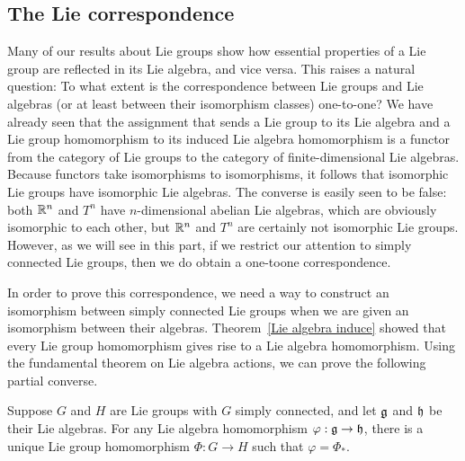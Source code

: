 \subsection{The Lie correspondence}
Many of our results about Lie groups show how essential properties of a Lie group are reflected in its Lie algebra, and vice versa. This raises a natural question: To what extent is the correspondence between Lie groups and Lie algebras (or at least between their isomorphism classes) one-to-one? We have already seen that the assignment that sends a Lie group to its Lie algebra and a Lie group homomorphism to its induced Lie algebra homomorphism is a functor from the category of Lie groups to the category of finite-dimensional Lie algebras. Because functors take isomorphisms to isomorphisms, it follows that isomorphic Lie groups have isomorphic Lie algebras. The converse is easily seen to be false: both $\mathbb{R}^n$ and $T^n$ have $n$-dimensional abelian Lie algebras, which are obviously isomorphic to each other, but $\mathbb{R}^n$ and $T^n$ are certainly not isomorphic Lie groups. However, as we will see in this part, if we restrict our attention to simply connected Lie groups, then we do obtain a one-toone correspondence.\par
In order to prove this correspondence, we need a way to construct an isomorphism between simply connected Lie groups when we are given an isomorphism between their algebras. Theorem~\ref{Lie algebra induce} showed that every Lie group homomorphism gives rise to a Lie algebra homomorphism. Using the fundamental theorem on Lie algebra actions, we can prove the following partial converse.
\begin{theorem}\label{Lie group homomorphism induced by algebra homo}
Suppose $G$ and $H$ are Lie groups with $G$ simply connected, and let $\mathfrak{g}$ and $\mathfrak{h}$ be their Lie algebras. For any Lie algebra homomorphism $\varphi:\mathfrak{g}\to\mathfrak{h}$, there is a unique Lie group homomorphism $\varPhi:G\to H$ such that $\varphi=\varPhi_*$.
\end{theorem}
